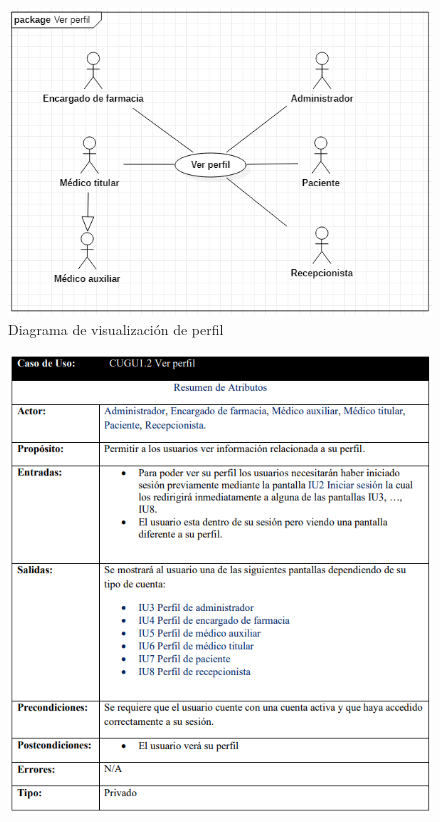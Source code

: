 \documentclass[12pt,letterpaper]{article}
\begin{document}
{\begin{figure}[H]
        \end{figure}
        \begin{figure}[H]
            \centering
            \includegraphics [scale=0.5]{verPerfil}
            \caption{Diagrama de visualización de perfil}
        \end{figure}
        \begin{figure}[H]
            \centering
            \includegraphics [scale=0.7]{especificacionVerPerfil}

\end{figure}}
\end{document}
